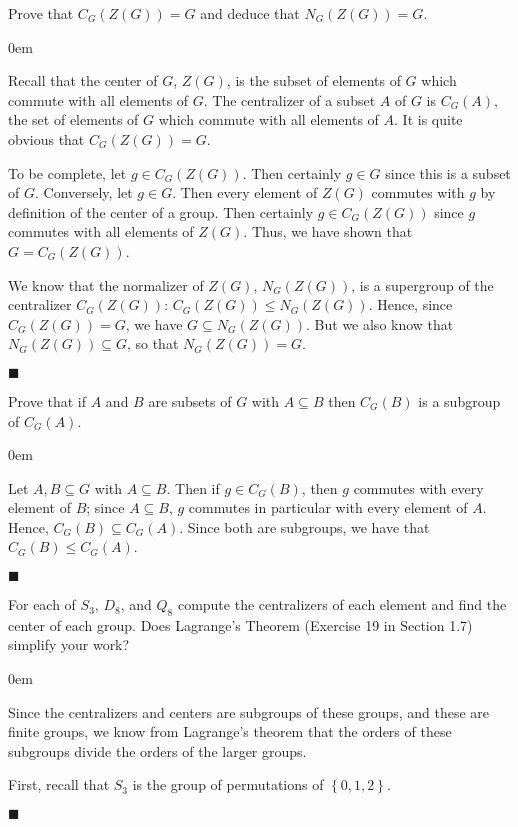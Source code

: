 \documentclass[12pt]{article}
\renewcommand{\qed}{\hfill$\blacksquare$}
\renewenvironment{proof}{\begin{addmargin}[1em]{0em}\begin{newproof}}{\end{newproof}\end{addmargin}\qed}
\newenvironment{problem}[2][Exercise]{\begin{trivlist}
\item[\hskip \labelsep {\bfseries #1}\hskip \labelsep {\bfseries #2.}]}{\end{trivlist}}
\begin{document}
\begin{problem}{2.2.2}
Prove that $C_G\left(Z\left(G\right)\right) = G$ and deduce that $N_G\left(Z\left(G\right)\right)=G$.
\end{problem}
\begin{proof}
Recall that the center of $G$, $Z\left(G\right)$, is the subset of elements of $G$ which commute with all elements of $G$. The centralizer of a subset $A$ of $G$ is $C_G\left(A\right)$, the set of elements of $G$ which commute with all elements of $A$. It is quite obvious that $C_G\left(Z\left(G\right)\right)=G$.

To be complete, let $g \in C_G\left(Z\left(G\right)\right)$. Then certainly $g\in G$ since this is a subset of $G$. Conversely, let $g\in G$. Then every element of $Z\left(G\right)$ commutes with $g$ by definition of the center of a group. Then certainly $g \in C_G\left(Z\left(G\right)\right)$ since $g$ commutes with all elements of $Z\left(G\right)$. Thus, we have shown that $G = C_G\left(Z\left(G\right)\right)$.

We know that the normalizer of $Z\left(G\right)$, $N_G\left(Z\left(G\right)\right)$, is a supergroup of the centralizer $C_G\left(Z\left(G\right)\right)$: $C_G\left(Z\left(G\right)\right) \leq N_G\left(Z\left(G\right)\right)$. Hence, since $C_G\left(Z\left(G\right)\right)=G$, we have $G\subseteq N_G\left(Z\left(G\right)\right)$. But we also know that $N_G\left(Z\left(G\right)\right) \subseteq G$, so that $N_G\left(Z\left(G\right)\right)=G$.
\end{proof}



\begin{problem}{2.2.3}
Prove that if $A$ and $B$ are subsets of $G$ with $A\subseteq B$ then $C_G\left(B\right)$ is a subgroup of $C_G\left(A\right)$.
\end{problem}
\begin{proof}
Let $A,B \subseteq G$ with $A\subseteq B$. Then if $g\in C_G\left(B\right)$, then $g$ commutes with every element of $B$; since $A\subseteq B$, $g$ commutes in particular with every element of $A$. Hence, $C_G\left(B\right) \subseteq C_G\left(A\right)$. Since both are subgroups, we have that $C_G\left(B\right) \leq C_G\left(A\right)$.
\end{proof}



\begin{problem}{2.2.4}
For each of $S_3$, $D_8$, and $Q_8$ compute the centralizers of each element and find the center of each group. Does Lagrange's Theorem (Exercise 19 in Section 1.7) simplify your work?
\end{problem}
\begin{proof}
Since the centralizers and centers are subgroups of these groups, and these are finite groups, we know from Lagrange's theorem that the orders of these subgroups divide the orders of the larger groups.

First, recall that $S_3$ is the group of permutations of $\left\{0,1,2\right\}$. 
\end{proof}
\end{document}
